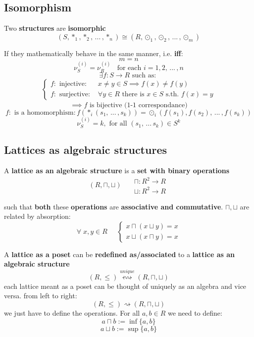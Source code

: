 	\subsection{Isomorphism}
	Two \textbf{structures} are \textbf{isomorphic}
	$$(S, \ast_1, \ast_2, \, ... \, , \ast_n) \cong (R, \odot_1, \odot_2, \, ... \, , \odot_m) $$

	\noindent
	If they mathematically behave in the same manner, i.e. \textbf{iff}:
	$$ m = n $$
	$$ \nu_S^{(i)} = \nu_R^{(i)} \;\; \text{ for each } i = 1,2, \, ... \, , n $$
	$$ \exists f : S \rightarrow R \text{ such as: } $$
	\vspace{-0.6cm}
	\begin{align*}
		\begin{cases}
		f : \text{ injective: }  &x \neq y \in S \implies f(x) \neq f(y) \\
		f : \text{ surjective: }  &\forall y \in R \text{ there is } x \in S \text{ s.th. } f(x) = y
	\end{cases}
	\end{align*}
	$$\implies f \text{ is bijective (1-1 correspondance)} $$
	$$ f: \text{ is a homomorphism}: f(\ast_i (s_1, \, ... \, , s_k)) = \odot_i(f(s_1), f(s_2), \, ... \, , f(s_k))$$
	$$ \nu_S^{(i)} = k, \text{ for all } (s_1, \, ... \, s_k) \in S^k $$

	\vspace{-0.15cm}

	\subsection{Lattices as algebraic structures}

	A \textbf{lattice as an algebraic structure} is a \textbf{set with binary operations}
	$$ (R, \sqcap, \sqcup) \;\;\;\;\;
	\begin{array}{c}
		\sqcap: R^2 \rightarrow R\\
		\sqcup: R^2 \rightarrow R
	\end{array}
	 $$

	\noindent
	such that \textbf{both} these \textbf{operations} are \textbf{associative and commutative}.
	$\sqcap, \sqcup$ are related by absorption:
	$$
	\forall\; x, y \in R \;\;\;\;\;
	\begin{cases}
		x \sqcap (x \sqcup y) = x \\
		x \sqcup (x \sqcap y) = x
	\end{cases}$$

	\noindent
	A \textbf{lattice as a poset} can be \textbf{redefined as/associated} to a \textbf{lattice as an algebraic structure}
	$$ (R, \leq ) \stackrel{unique}{\leftrightsquigarrow} (R, \sqcap, \sqcup)$$
	each lattice meant as a poset can be thought of uniquely as an algebra and vice versa.
	from left to right:
	$$ (R, \leq ) \rightsquigarrow (R, \sqcap, \sqcup) $$
	we just have to define the operations. For all $a,b \in R$ we need to define:
	$$ a \sqcap b := \inf \{a, b\}$$
	$$ a \sqcup b := \sup \{a,b\}$$

